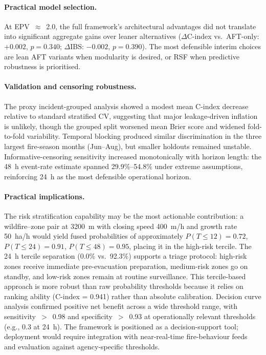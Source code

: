 \documentclass[fire,article,submit,pdftex]{../Definitions/mdpi}
\begin{document}
\paragraph{Practical model selection.}
At EPV~$\approx$~2.0, the full framework's architectural advantages did not translate into significant aggregate gains over leaner alternatives ($\Delta$C-index vs.\ AFT-only: $+0.002$, $p = 0.340$; $\Delta$IBS: $-0.002$, $p = 0.390$).
The most defensible interim choices are lean AFT variants when modularity is desired, or RSF when predictive robustness is prioritised.

\paragraph{Validation and censoring robustness.}
The proxy incident-grouped analysis showed a modest mean C-index decrease relative to standard stratified CV, suggesting that major leakage-driven inflation is unlikely, though the grouped split worsened mean Brier score and widened fold-to-fold variability.
Temporal blocking produced similar discrimination in the three largest fire-season months (Jun--Aug), but smaller holdouts remained unstable.
Informative-censoring sensitivity increased monotonically with horizon length: the 48~h event-rate estimate spanned 29.9\%--54.8\% under extreme assumptions, reinforcing 24~h as the most defensible operational horizon.

\paragraph{Practical implications.}
The risk stratification capability may be the most actionable contribution: a wildfire--zone pair at 3200~m with closing speed 400~m/h and growth rate 50~ha/h would yield fused probabilities of approximately $P(T \leq 12) = 0.72$, $P(T \leq 24) = 0.91$, $P(T \leq 48) = 0.95$, placing it in the high-risk tercile.
The 24~h tercile separation (0.0\% vs.\ 92.3\%) supports a triage protocol: high-risk zones receive immediate pre-evacuation preparation, medium-risk zones go on standby, and low-risk zones remain at routine surveillance.
This tercile-based approach is more robust than raw probability thresholds because it relies on ranking ability (C-index = 0.941) rather than absolute calibration.
Decision curve analysis confirmed positive net benefit across a wide threshold range, with sensitivity~$>$~0.98 and specificity~$>$~0.93 at operationally relevant thresholds (e.g., 0.3 at 24~h).
The framework is positioned as a decision-support tool; deployment would require integration with near-real-time fire-behaviour feeds~\cite{Radeloff2023} and evaluation against agency-specific thresholds.
\end{document}
